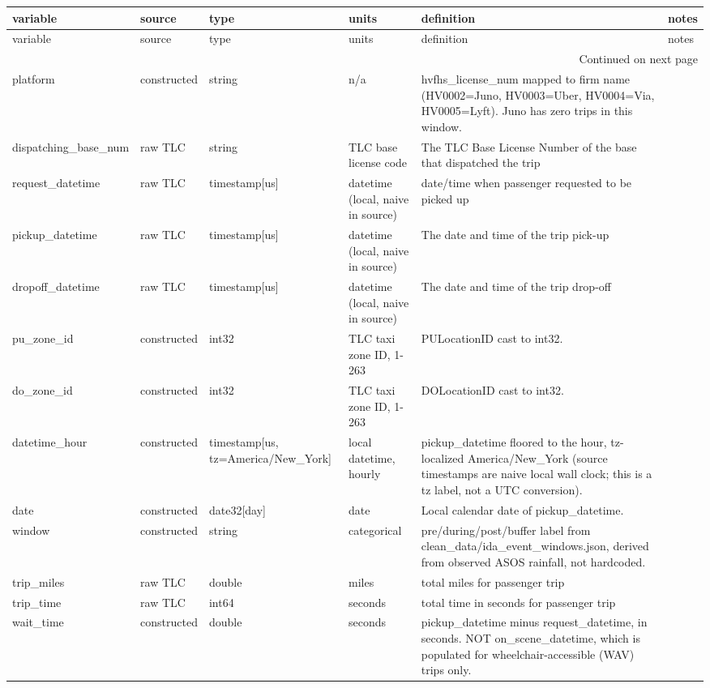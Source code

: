 \begin{longtable}{llllll}
\toprule
variable & source & type & units & definition & notes \\
\midrule
\endfirsthead
\toprule
variable & source & type & units & definition & notes \\
\midrule
\endhead
\midrule
\multicolumn{6}{r}{Continued on next page} \\
\midrule
\endfoot
\bottomrule
\endlastfoot
platform & constructed & string & n/a & hvfhs_license_num mapped to firm name (HV0002=Juno, HV0003=Uber, HV0004=Via, HV0005=Lyft). Juno has zero trips in this window. &  \\
dispatching_base_num & raw TLC & string & TLC base license code & The TLC Base License Number of the base that dispatched the trip &  \\
request_datetime & raw TLC & timestamp[us] & datetime (local, naive in source) & date/time when passenger requested to be picked up &  \\
pickup_datetime & raw TLC & timestamp[us] & datetime (local, naive in source) & The date and time of the trip pick-up &  \\
dropoff_datetime & raw TLC & timestamp[us] & datetime (local, naive in source) & The date and time of the trip drop-off &  \\
pu_zone_id & constructed & int32 & TLC taxi zone ID, 1-263 & PULocationID cast to int32. &  \\
do_zone_id & constructed & int32 & TLC taxi zone ID, 1-263 & DOLocationID cast to int32. &  \\
datetime_hour & constructed & timestamp[us, tz=America/New_York] & local datetime, hourly & pickup_datetime floored to the hour, tz-localized America/New_York (source timestamps are naive local wall clock; this is a tz label, not a UTC conversion). &  \\
date & constructed & date32[day] & date & Local calendar date of pickup_datetime. &  \\
window & constructed & string & categorical & pre/during/post/buffer label from clean_data/ida_event_windows.json, derived from observed ASOS rainfall, not hardcoded. &  \\
trip_miles & raw TLC & double & miles & total miles for passenger trip &  \\
trip_time & raw TLC & int64 & seconds & total time in seconds for passenger trip &  \\
wait_time & constructed & double & seconds & pickup_datetime minus request_datetime, in seconds. NOT on_scene_datetime, which is populated for wheelchair-accessible (WAV) trips only. &  \\

\end{longtable}
